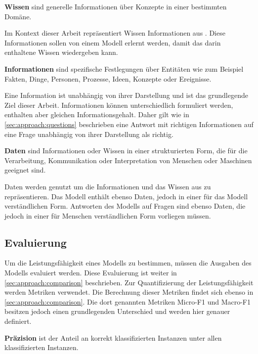 \begin{definition}\label{def:wissen}
    \textbf{Wissen} sind generelle Informationen über Konzepte in einer bestimmten Domäne.
\end{definition}
Im Kontext dieser Arbeit repräsentiert Wissen Informationen aus \citet{bb}.
Diese Informationen sollen von einem Modell erlernt werden, damit das darin enthaltene Wissen wiedergeben kann.

\begin{definition}\label{def:information}
    \textbf{Informationen} sind spezifische Festlegungen über Entitäten wie zum Beispiel Fakten, Dinge, Personen, Prozesse, Ideen, Konzepte oder Ereignisse.
\end{definition}
Eine Information ist unabhängig von ihrer Darstellung und ist das grundlegende Ziel dieser Arbeit.
Informationen können unterschiedlich formuliert werden, enthalten aber gleichen Informationsgehalt.
Daher gilt wie in \cref{sec:approach:questions} beschrieben eine Antwort mit richtigen Informationen auf eine Frage unabhängig von ihrer Darstellung als richtig.

\begin{definition}\label{def:daten}
    \textbf{Daten} sind Informationen oder Wissen in einer strukturierten Form, die für die Verarbeitung, Kommunikation oder Interpretation von Menschen oder Maschinen geeignet sind.
\end{definition}
Daten werden genutzt um die Informationen und das Wissen aus \citet{bb} zu repräsentieren.
Das Modell enthält ebenso Daten, jedoch in einer für das Modell verständlichen Form.
Antworten des Modells auf Fragen sind ebenso Daten, die jedoch in einer für Menschen verständlichen Form vorliegen müssen.


\subsection{Evaluierung}
Um die Leistungsfähigkeit eines Modells zu bestimmen, müssen die Ausgaben des Modells evaluiert werden.
Diese Evaluierung ist weiter in \cref{sec:approach:comparison} beschrieben.
Zur Quantifizierung der Leistungsfähigkeit werden Metriken verwendet.
Die Berechnung dieser Metriken findet sich ebenso in \cref{sec:approach:comparison}.
Die dort genannten Metriken Micro-F1 und Macro-F1 besitzen jedoch einen grundlegenden Unterschied und werden hier genauer definiert.

\begin{definition}
    \textbf{Präzision} ist der Anteil an korrekt klassifizierten Instanzen unter allen klassifizierten Instanzen.
\end{definition}

